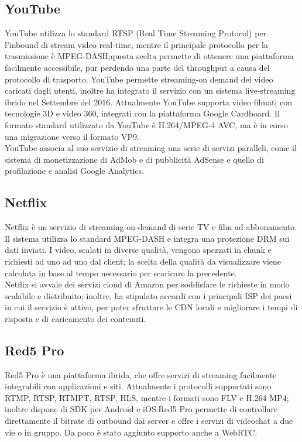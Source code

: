 	\subsection{YouTube}
	YouTube utilizza lo standard RTSP (Real Time Streaming Protocol) per l'inbound di stream video real-time, mentre il principale protocollo per la trasmissione è MPEG-DASH;\@ questa scelta permette di ottenere una piattaforma facilmente accessibile, pur perdendo una parte del throughput a causa del protocollo di trasporto. YouTube permette streaming-on demand dei video caricati dagli utenti, inoltre ha integrato il servizio con un sistema live-streaming ibrido nel Settembre del 2016. Attualmente YouTube supporta video filmati con tecnologie 3D e video 360\textdegree, integrati con la piattaforma Google Cardboard. Il formato standard utilizzato da YouTube è H.264/MPEG-4 AVC, ma è in corso una migrazione verso il formato VP9.
	\\
	YouTube associa al suo servizio di streaming una serie di servizi paralleli, come il sistema di monetizzazione di AdMob e di pubblicità AdSense e quello di profilazione e analisi Google Analytics.

	\subsection{Netflix}
	Netflix è un servizio di streaming on-demand di serie TV e film ad abbonamento. Il sistema utilizza lo standard MPEG-DASH e integra una protezione DRM sui dati inviati. I video, scalati in diverse qualità, vengono spezzati in chunk e richiesti ad uno ad uno dal client; la scelta della qualità da visualizzare viene calcolata in base al tempo necessario per scaricare la precedente.
	\\
	Netflix si avvale dei servizi cloud di Amazon per soddisfare le richieste in modo scalabile e distribuito; inoltre, ha stipulato accordi con i principali \gls{ISP} dei paesi in cui il servizio è attivo, per poter sfruttare le \gls{CDN} locali e migliorare i tempi di risposta e di caricamento dei contenuti.

	\subsection{Red5 Pro}
	Red5 Pro è una piattaforma ibrida, che offre servizi di streaming facilmente integrabili con applicazioni e siti. Attualmente i protocolli supportati sono RTMP, RTSP, RTMPT, RTSP, HLS, mentre i formati sono FLV e H.264 MP4; inoltre dispone di SDK per Android e iOS.\@ Red5 Pro permette di controllare direttamente il bitrate di outbound dai server e offre i servizi di videochat a due vie o in gruppo. Da poco è stato aggiunto supporto anche a WebRTC.\@

